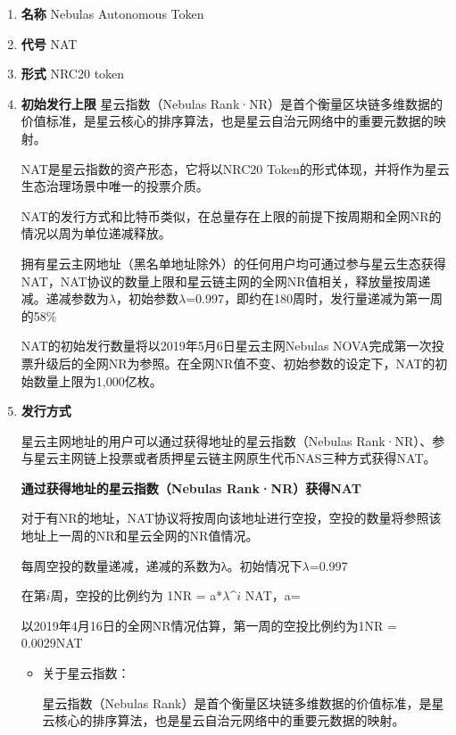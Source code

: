 \begin{enumerate}
	\item \textbf{名称}
	Nebulas Autonomous Token
		
	\item \textbf{代号}
	NAT

	\item  \textbf{形式}
	NRC20 token

	\item \textbf{初始发行上限}
	星云指数（Nebulas Rank·NR）是首个衡量区块链多维数据的价值标准，是星云核心的排序算法，也是星云自治元网络中的重要元数据的映射。
	
	NAT是星云指数的资产形态，它将以NRC20 Token的形式体现，并将作为星云生态治理场景中唯一的投票介质。
	
	NAT的发行方式和比特币类似，在总量存在上限的前提下按周期和全网NR的情况以周为单位递减释放。
	
	拥有星云主网地址（黑名单地址除外）的任何用户均可通过参与星云生态获得NAT，NAT协议的数量上限和星云链主网的全网NR值相关，释放量按周递减。递减参数为$λ$，初始参数$λ$=0.997，即约在180周时，发行量递减为第一周的58\% 
	
	NAT的初始发行数量将以2019年5月6日星云主网Nebulas NOVA完成第一次投票升级后的全网NR为参照。在全网NR值不变、初始参数的设定下，NAT的初始数量上限为1,000亿枚。

	\item \textbf{发行方式}
	
	星云主网地址的用户可以通过获得地址的星云指数（Nebulas Rank·NR）、参与星云主网链上投票或者质押星云链主网原生代币NAS三种方式获得NAT。

\textbf{通过获得地址的星云指数（Nebulas Rank·NR）获得NAT}

	对于有NR的地址，NAT协议将按周向该地址进行空投，空投的数量将参照该地址上一周的NR和星云全网的NR值情况。

	每周空投的数量递减，递减的系数为λ。初始情况下$λ$=0.997

	在第$i$周，空投的比例约为 1NR = a*$λ$^$i$ NAT，a=  

	以2019年4月16日的全网NR情况估算，第一周的空投比例约为1NR = 0.0029NAT

\begin{itemize}

	\item 关于星云指数：
	
	星云指数（Nebulas Rank）是首个衡量区块链多维数据的价值标准，是星云核心的排序算法，也是星云自治元网络中的重要元数据的映射。


\end{itemize}
\end{enumerate}
